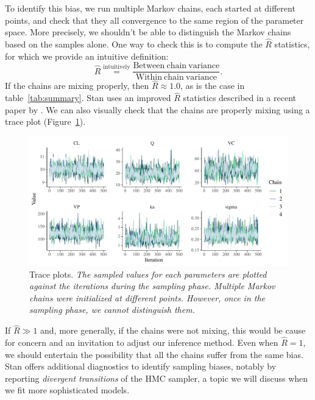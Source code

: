 To identify this bias, we run multiple Markov chains, each started at different points, and check that they all convergence to the same region of the parameter space.
More precisely, we shouldn't be able to distinguish the Markov chains based on the samples alone.
One way to check this is to compute the $\hat R$ statistics, for which we provide an intuitive definition:
\begin{equation*}
  \hat R \overset{\mathrm{intuitively}}{=} \frac{\mathrm{Between \ chain \ variance}}{\mathrm{Within \ chain \ variance}}.
\end{equation*}
%
If the chains are mixing properly, then $\hat R \approx 1.0$, as is the case in table~\ref{tab:summary}.
Stan uses an improved $\hat R$ statistics described in a recent paper by \citet{Vehtari:2020}.
We can also visually check that the chains are properly mixing using a trace plot (Figure~\ref{fig:trace}).

\begin{figure}
  \begin{center}
  \includegraphics[width = 6in]{../figures/twocpt_traceplots_4x8.pdf}
  \caption{Trace plots. \textit{The sampled values for each parameters are plotted against the iterations during the sampling phase. Multiple Markov chains were initialized at different points. However, once in the sampling phase, we cannot distinguish them.}}
  \label{fig:trace}
  \end{center}
\end{figure}

If $\hat R \gg 1$ and, more generally, if the chains were not mixing, this would be cause for concern and an invitation to adjust our inference method.
Even when $\hat R = 1$, we should entertain the possibility that all the chains suffer from the same bias.
Stan offers additional diagnostics to identify sampling biases, notably by reporting \textit{divergent transitions} of the HMC sampler, a topic we will discuss when we fit more sophisticated models.

